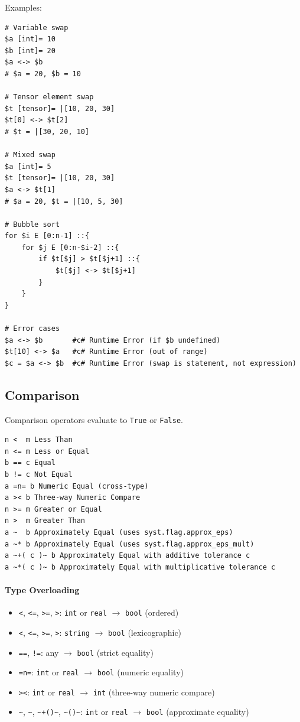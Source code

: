 Examples:
\begin{verbatim}
# Variable swap
$a [int]= 10
$b [int]= 20
$a <-> $b
# $a = 20, $b = 10

# Tensor element swap
$t [tensor]= |[10, 20, 30]
$t[0] <-> $t[2]
# $t = |[30, 20, 10]

# Mixed swap
$a [int]= 5
$t [tensor]= |[10, 20, 30]
$a <-> $t[1]
# $a = 20, $t = |[10, 5, 30]

# Bubble sort
for $i E [0:n-1] ::{
    for $j E [0:n-$i-2] ::{
        if $t[$j] > $t[$j+1] ::{
            $t[$j] <-> $t[$j+1]
        }
    }
}

# Error cases
$a <-> $b       #c# Runtime Error (if $b undefined)
$t[10] <-> $a   #c# Runtime Error (out of range)
$c = $a <-> $b  #c# Runtime Error (swap is statement, not expression)
\end{verbatim}

\subsection{Comparison}
Comparison operators evaluate to \texttt{True} or \texttt{False}.
\begin{verbatim}
n <  m Less Than
n <= m Less or Equal
b == c Equal
b != c Not Equal
a =n= b Numeric Equal (cross-type)
a >< b Three-way Numeric Compare
n >= m Greater or Equal
n >  m Greater Than
a ~  b Approximately Equal (uses syst.flag.approx_eps)
a ~* b Approximately Equal (uses syst.flag.approx_eps_mult)
a ~+( c )~ b Approximately Equal with additive tolerance c
a ~*( c )~ b Approximately Equal with multiplicative tolerance c
\end{verbatim}

\paragraph{Type Overloading}
\begin{itemize}
\item \texttt{<}, \texttt{<=}, \texttt{>=}, \texttt{>}: \texttt{int} or \texttt{real} $\rightarrow$ \texttt{bool} (ordered)
\item \texttt{<}, \texttt{<=}, \texttt{>=}, \texttt{>}: \texttt{string} $\rightarrow$ \texttt{bool} (lexicographic)
\item \texttt{==}, \texttt{!=}: any $\rightarrow$ \texttt{bool} (strict equality)
\item \texttt{=n=}: \texttt{int} or \texttt{real} $\rightarrow$ \texttt{bool} (numeric equality)
\item \texttt{><}: \texttt{int} or \texttt{real} $\rightarrow$ \texttt{int} (three-way numeric compare)
\item \texttt{\textasciitilde}, \texttt{\textasciitilde*}, \texttt{\textasciitilde+()\textasciitilde}, \texttt{\textasciitilde*()\textasciitilde}: \texttt{int} or \texttt{real} $\rightarrow$ \texttt{bool} (approximate equality)
\end{itemize}

